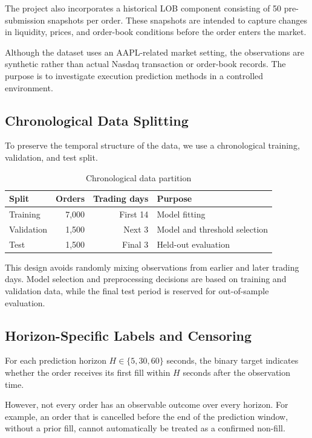 \documentclass[11pt,a4paper]{article}
\begin{document}
The project also incorporates a historical LOB component
consisting of 50 pre-submission snapshots per order.
These snapshots are intended to capture changes in
liquidity, prices, and order-book conditions before
the order enters the market.

Although the dataset uses an AAPL-related market setting,
the observations are synthetic rather than actual Nasdaq
transaction or order-book records. The purpose is to
investigate execution prediction methods in a controlled
environment.

\subsection{Chronological Data Splitting}

To preserve the temporal structure of the data, we use
a chronological training, validation, and test split.

\begin{table}[htbp]
	\centering
	\caption{Chronological data partition}
	\label{tab:data_split}
	\begin{tabular}{lrrl}
		\toprule
		Split & Orders & Trading days & Purpose \\
		\midrule
		Training & 7,000 & First 14 & Model fitting \\
		Validation & 1,500 & Next 3 & Model and threshold selection \\
		Test & 1,500 & Final 3 & Held-out evaluation \\
		\bottomrule
	\end{tabular}
\end{table}

This design avoids randomly mixing observations from
earlier and later trading days. Model selection and
preprocessing decisions are based on training and
validation data, while the final test period is reserved
for out-of-sample evaluation.

\subsection{Horizon-Specific Labels and Censoring}

For each prediction horizon
$H \in \{5,30,60\}$ seconds, the binary target indicates
whether the order receives its first fill within $H$
seconds after the observation time.

However, not every order has an observable outcome
over every horizon. For example, an order that is
cancelled before the end of the prediction window,
without a prior fill, cannot automatically be treated
as a confirmed non-fill.
\end{document}
